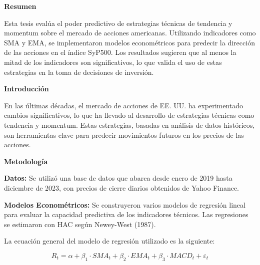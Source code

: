 \documentclass[a0,portrait]{a0poster}
\newcommand{\customsection}[1]{
    \begin{center}
        \begin{tcolorbox}[colframe=miRojo!50, colback=miRojo!30, width=\linewidth, boxrule=1mm, arc=3mm, auto outer arc]
            \begin{center}
            \vspace{.5cm} %
            \color{black}
            \textbf{\Huge #1}
            \color{miRojo}
            \vspace{.5cm} %
            \end{center}
        \end{tcolorbox}
    \end{center}
}
\begin{document}
\vspace{2cm}
\normalsize %
\begin{multicols}{2}

    \customsection{Resumen}
    \par
     Esta tesis evalúa el poder predictivo de estrategias técnicas de tendencia y momentum sobre el mercado de acciones americanas. Utilizando indicadores como SMA y EMA, se implementaron modelos econométricos para predecir la dirección de las acciones en el índice SyP500. Los resultados sugieren que al menos la mitad de los indicadores son significativos, lo que valida el uso de estas estrategias en la toma de decisiones de inversión.
    \customsection{Introducción}
    \par
     En las últimas décadas, el mercado de acciones de EE. UU. ha experimentado cambios significativos, lo que ha llevado al desarrollo de estrategias técnicas como tendencia y momentum. Estas estrategias, basadas en análisis de datos históricos, son herramientas clave para predecir movimientos futuros en los precios de las acciones.
    \customsection{Metodología}
    \par
    \textbf{Datos:} Se utilizó una base de datos que abarca desde enero de 2019 hasta diciembre de 2023, con precios de cierre diarios obtenidos de Yahoo Finance. 
    \par
    \textbf{Modelos Econométricos:} Se construyeron varios modelos de regresión lineal para evaluar la capacidad predictiva de los indicadores técnicos. Las regresiones se estimaron con HAC según Newey-West (1987).
    
    La ecuación general del modelo de regresión utilizado es la siguiente:

    \begin{equation}
        R_t = \alpha + \beta_1 \cdot SMA_t + \beta_2 \cdot EMA_t + \beta_3 \cdot MACD_t + \varepsilon_t
    \end{equation}
    

\end{multicols}
\end{document}

